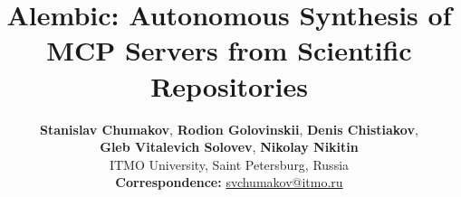 \documentclass[11pt]{article}
\title{Alembic: Autonomous Synthesis of MCP Servers from Scientific Repositories}
\author{
  \textbf{Stanislav Chumakov},
  \textbf{Rodion Golovinskii},
  \textbf{Denis Chistiakov},
  \\
  \textbf{Gleb Vitalevich Solovev},
  \textbf{Nikolay Nikitin}
  \\
  ITMO University, Saint Petersburg, Russia
  \\
  \small{
    \textbf{Correspondence:} \href{mailto:svchumakov@itmo.ru}{svchumakov@itmo.ru}
  }
}
\begin{document}
\maketitle

\begin{abstract}

\end{abstract}









% 


\end{document}
